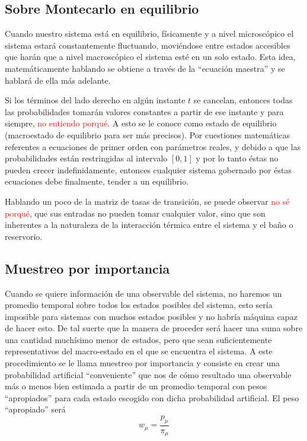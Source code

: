 \documentclass[12pt]{book}
\begin{document}
\subsection{Sobre Montecarlo en equilibrio}
Cuando nuestro sistema está en equilibrio, físicamente y a nivel microscópico el sistema estará constantemente fluctuando, moviéndose entre estados accesibles que harán que a nivel macroscópico el sistema esté en un solo estado. Esta idea, matemáticamente hablando se obtiene a través de la ``ecuación maestra'' y se hablará de ella más adelante. 

Si los términos del lado derecho en algún instante $t$ se cancelan, entonces todas las probabilidades tomarán valores constantes a partir de ese instante y para siempre, \textcolor{red}{no entiendo porqué}. A esto se le conoce como estado de equilibrio (macroestado de equilibrio para ser más precisos). Por cuestiones matemáticas referentes a ecuaciones de primer orden con parámetros reales, y debido a que las probabilidades están restringidas al intervalo $[0,1]$ y por lo tanto éstas no pueden crecer indefinidamente, entonces cualquier sistema gobernado por éstas ecuaciones debe finalmente, tender a un equilibrio. 

Hablando un poco de la matriz de tasas de transición, se puede observar \textcolor{red}{no sé porqué}, que sus entradas no pueden tomar cualquier valor, sino que son inherentes a la naturaleza de la interacción térmica entre el sistema y el baño o reservorio.
\subsection{Muestreo por importancia}
Cuando se quiere información de una observable del sistema, no haremos un promedio temporal sobre todos los estados posibles del sistema, esto sería imposible para sistemas con muchos estados posibles y no habría máquina capaz de hacer esto. De tal suerte que la manera de proceder será hacer una suma sobre una cantidad muchísimo menor de estados, pero que sean suficientemente representativos del macro-estado en el que se encuentra el sistema. A este procedimiento se le llama muestreo por importancia y consiste en crear una probabilidad artificial ``conveniente'' que nos de cómo resultado una observable más o menos bien estimada a partir de un promedio temporal con pesos ``apropiados'' para cada estado escogido con dicha probabilidad artificial. El peso ``apropiado'' será
\begin{equation}
w_{\mu}= \frac{p_{\mu}}{\pi_{\mu}}
\end{equation}
\end{document}
